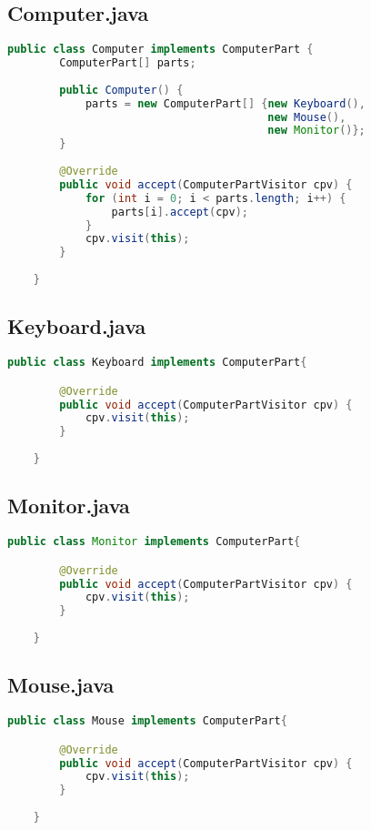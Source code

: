 \subsection{Computer.java}
\begin{lstlisting}[language=java]
    public class Computer implements ComputerPart {
        ComputerPart[] parts;
    
        public Computer() {
            parts = new ComputerPart[] {new Keyboard(),
                                        new Mouse(),
                                        new Monitor()};
        }
    
        @Override
        public void accept(ComputerPartVisitor cpv) {
            for (int i = 0; i < parts.length; i++) {
                parts[i].accept(cpv);
            }
            cpv.visit(this);
        }
        
    }
\end{lstlisting}

\subsection{Keyboard.java}
\begin{lstlisting}[language=java]
    public class Keyboard implements ComputerPart{

        @Override
        public void accept(ComputerPartVisitor cpv) {
            cpv.visit(this);
        }
        
    }
\end{lstlisting}

\subsection{Monitor.java}
\begin{lstlisting}[language=java]
    public class Monitor implements ComputerPart{

        @Override
        public void accept(ComputerPartVisitor cpv) {
            cpv.visit(this);
        }
        
    }
\end{lstlisting}

\subsection{Mouse.java}
\begin{lstlisting}[language=java]
    public class Mouse implements ComputerPart{

        @Override
        public void accept(ComputerPartVisitor cpv) {
            cpv.visit(this);
        }
        
    }
\end{lstlisting}

